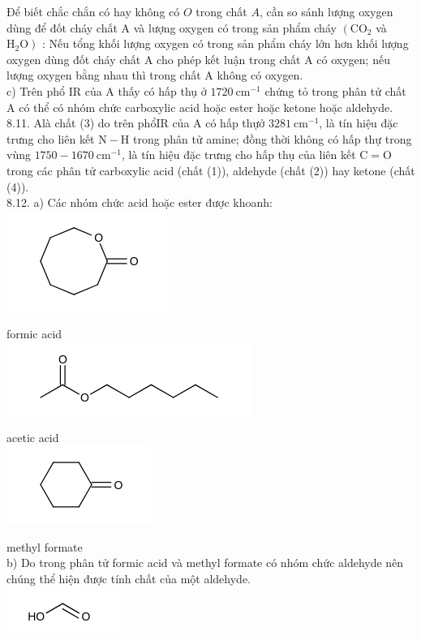 \documentclass[10pt]{article}
\begin{document}
Để biết chắc chắn có hay không có $O$ trong chất $A$, cần so sánh lượng oxygen dùng để đốt cháy chất A và lượng oxygen có trong sản phẩm cháy $\left(\mathrm{CO}_{2}\right.$ và $\left.\mathrm{H}_{2} \mathrm{O}\right)$ : Nếu tổng khối lượng oxygen có trong sản phẩm cháy lớn hơn khối lượng oxygen dùng đốt cháy chất A cho phép kết luận trong chất A có oxygen; nếu lượng oxygen bằng nhau thì trong chất A không có oxygen.\\
c) Trên phổ IR của A thấy có hấp thụ ở $1720 \mathrm{~cm}^{-1}$ chứng tỏ trong phân tử chất A có thể có nhóm chức carboxylic acid hoặc ester hoặc ketone hoặc aldehyde.\\
8.11. Alà chất (3) do trên phổIR của A có hấp thựở $3281 \mathrm{~cm}^{-1}$, là tín hiệu đặc trưng cho liên kết $\mathrm{N}-\mathrm{H}$ trong phân tử amine; đồng thời không có hấp thự trong vùng $1750-1670 \mathrm{~cm}^{-1}$, là tín hiệu đặc trưng cho hấp thụ của liên kết $\mathrm{C}=\mathrm{O}$ trong các phân tử carboxylic acid (chất (1)), aldehyde (chất (2)) hay ketone (chất (4)).\\
8.12. a) Các nhóm chức acid hoặc ester được khoanh:\\
\includegraphics{smile-5b3cdc53965d017086e900b2b1f31e650836f869}

formic acid\\
\includegraphics{smile-b389954ca42e6eadd69f6f9e9ae6773999a21ae6}

acetic acid\\
\includegraphics{smile-9410f9e408d3f9a7da6c439d17e79f6a7b7f10e7}

methyl formate\\
b) Do trong phân tử formic acid và methyl formate có nhóm chức aldehyde nên chúng thể hiện được tính chất của một aldehyde.\\
\includegraphics{smile-fe0a767c7ec10697c898ad9be9abfe6a2ffccd59}
\end{document}
